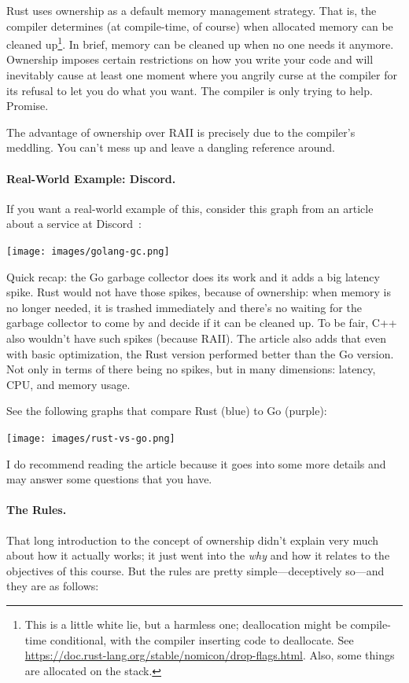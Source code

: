 \documentclass[a4paper]{report}
\begin{document}
Rust uses ownership as a default memory management strategy. That is, the compiler determines (at compile-time, of course) when allocated memory can be cleaned up\footnote{This is a little white lie, but a harmless one; deallocation might be compile-time conditional, with the compiler inserting code to deallocate. See \url{https://doc.rust-lang.org/stable/nomicon/drop-flags.html}. Also, some things are allocated on the stack.}. In brief, memory can be cleaned up when no one needs it anymore. Ownership imposes certain restrictions on how you write your code and will inevitably cause at least one moment where you angrily curse at the compiler for its refusal to let you do what you want. The compiler is only trying to help. Promise.

The advantage of ownership over RAII is precisely due to the compiler's meddling. You can't mess up and leave a dangling reference around.

\paragraph{Real-World Example: Discord.} If you want a real-world example of this, consider this graph from an article about a service at Discord~\cite{discord}:

\begin{center}
\texttt{[image: images/golang-gc.png]}
\end{center}

Quick recap: the Go garbage collector does its work and it adds a big latency spike. Rust would not have those spikes, because of ownership: when memory is no longer needed, it is trashed immediately and there's no waiting for the garbage collector to come by and decide if it can be cleaned up. To be fair, C++ also wouldn't have such spikes (because RAII). The article also adds that even with basic optimization, the Rust version performed better than the Go version. Not only in terms of there being no spikes, but in many dimensions: latency, CPU, and memory usage.

See the following graphs that compare Rust (blue) to Go (purple): 
\begin{center}
\texttt{[image: images/rust-vs-go.png]}
\end{center}

I do recommend reading the article because it goes into some more details and may answer some questions that you have. 

\paragraph{The Rules.}
That long introduction to the concept of ownership didn't explain very much about how it actually works; it just went into the \textit{why} and how it relates to the objectives of this course. But the rules are pretty simple---deceptively so---and they are as follows:
\end{document}
